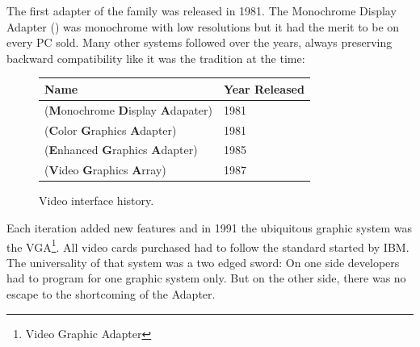 \documentclass[book.tex]{subfiles}
\begin{document}
The first adapter of the family was released in 1981. The Monochrome Display
   Adapter () was monochrome with low resolutions but it had the merit to be on every PC sold. Many other systems followed over the years, always preserving backward compatibility like it was the tradition at the time:
\bigskip
  
 \begin{figure}[H]
\centering  
\begin{tabularx}{\textwidth}{ X  Y }
  \toprule
  \textbf{Name} &  \textbf{Year Released} \\
  \toprule {}
   (\textbf{M}onochrome
   \textbf{D}isplay
   \textbf{A}dapater) & 1981 
   \\ 
   (\textbf{C}olor
   \textbf{G}raphics
   \textbf{A}dapter) & 1981 
    \\ 
   (\textbf{E}nhanced
   \textbf{G}raphics
   \textbf{A}dapter) & 1985
   \\ 
   (\textbf{V}ideo
   \textbf{G}raphics
   \textbf{A}rray)  & 1987
    \\
  \toprule
\end{tabularx}
\caption{Video interface history.}\label{fig:vga_history}
\end{figure}

Each iteration added new features and in 1991 the ubiquitous graphic system was the VGA\footnote{Video Graphic Adapter}. All video cards purchased had to follow the standard started by IBM. The universality of that system was a two edged sword: On one side developers had to program for one graphic system only. But on the other side, there was no escape to the shortcoming of the Adapter.\\
\end{document}
